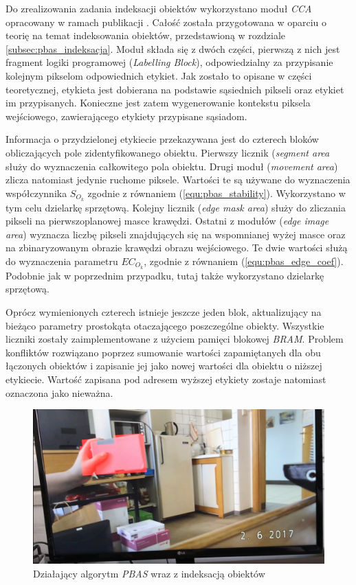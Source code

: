 Do zrealizowania zadania indeksacji obiektów wykorzystano moduł \textit{CCA} opracowany w ramach publikacji \cite{kryjak_14_pbas}. 
Całość została przygotowana w oparciu o teorię na temat indeksowania obiektów, przedstawioną w rozdziale \ref{subsec:pbas_indeksacja}. 
Moduł składa się z dwóch części, pierwszą z nich jest fragment logiki programowej (\textit{Labelling Block}), odpowiedzialny za przypisanie kolejnym pikselom odpowiednich etykiet. 
Jak zostało to opisane w części teoretycznej, etykieta jest dobierana na podstawie sąsiednich pikseli oraz etykiet im przypisanych. 
Konieczne jest zatem wygenerowanie kontekstu piksela wejściowego, zawierającego etykiety przypisane sąsiadom.

Informacja o przydzielonej etykiecie przekazywana jest do czterech bloków obliczających pole zidentyfikowanego obiektu. 
Pierwszy licznik (\textit{segment area} służy do wyznaczenia całkowitego pola obiektu. 
Drugi moduł (\textit{movement area}) zlicza natomiast jedynie ruchome piksele. 
Wartości te są używane do wyznaczenia współczynnika $S_{O_k}$ zgodnie z równaniem (\ref{equ:pbas_stability}). 
Wykorzystano w tym celu dzielarkę sprzętową. 
Kolejny licznik (\textit{edge mask area}) służy do zliczania pikseli na pierwszoplanowej masce krawędzi. 
Ostatni z modułów (\textit{edge image area}) wyznacza liczbę pikseli znajdujących się na wspomnianej wyżej masce oraz na zbinaryzowanym obrazie krawędzi obrazu wejściowego. 
Te dwie wartości służą do wyznaczenia parametru $EC_{O_k}$, zgodnie z równaniem (\ref{equ:pbas_edge_coef}). 
Podobnie jak w poprzednim przypadku, tutaj także wykorzystano dzielarkę sprzętową.

Oprócz wymienionych czterech istnieje jeszcze jeden blok, aktualizujący na bieżąco parametry prostokąta otaczającego poszczególne obiekty. Wszystkie liczniki zostały zaimplementowane z użyciem pamięci blokowej \textit{BRAM}. 
Problem konfliktów rozwiązano poprzez sumowanie wartości zapamiętanych dla obu łączonych obiektów i zapisanie jej jako nowej wartości dla obiektu o niższej etykiecie. 
Wartość zapisana pod adresem wyższej etykiety zostaje natomiast oznaczona jako nieważna.

	\begin{figure}[h!]
		\centering
		\includegraphics[scale=0.2]{img/4/pbas_plus_example.png}
		\caption{Działający algorytm \textit{PBAS} wraz z indeksacją obiektów}
		\label{fig:pbas_plus_demo}
	\end{figure}


